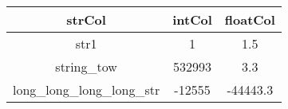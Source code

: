 \begin{tabular}{|c|c|c|}
	\hline
	strCol & intCol & floatCol \\
	\hline
	str1 & 1 & 1.5 \\
	\hline
	string\_tow & 532993 & 3.3 \\
	\hline
	long\_long\_long\_long\_str & -12555 & -44443.3 \\
	\hline
\end{tabular}